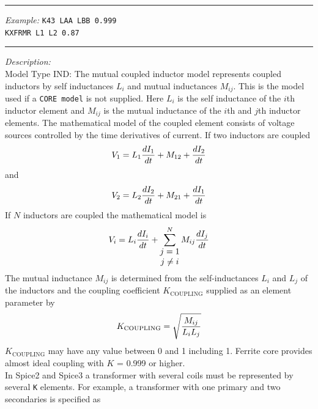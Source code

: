\documentclass{article}
\begin{document}
\newline
\rule{\textwidth}{0.5mm}
\newline
\textit{Example:}
\newline
\texttt{K43 LAA LBB 0.999 \\ KXFRMR L1 L2 0.87}
\newline
\rule{\textwidth}{0.5mm}
\newline
\textit{Description:}\\
Model Type {IND}: The mutual coupled inductor
model represents coupled inductors by self inductances $L_i$ and
mutual inductances $M_{ij}$. This is the model used if a
{\tt CORE model} is not supplied. Here $L_i$ is the self
inductance of the $i$th inductor element and $M_{ij}$ is the
mutual inductance of the $i$th and $j$th inductor elements. The
mathematical model of the coupled element consists of voltage
sources controlled by the time derivatives of current. If two
inductors are coupled
\begin{equation}
      V_1 = L_1 {{\textstyle dI_1} \over {\textstyle dt}}
         + M_{12} + {{\textstyle dI_2} \over {\textstyle dt}}
\end{equation}
and
\begin{equation}
      V_2 = L_2 {{\textstyle dI_2} \over {\textstyle dt}}
         + M_{21} + {{\textstyle dI_1} \over {\textstyle dt}}
\end{equation}
If $N$ inductors are coupled the mathematical model is
\begin{equation}
      V_i = L_i {{\textstyle dI_i} \over {\textstyle dt}}
         + \sum_{\shortstack{$j=1$\\ $j\ne i$}}^N
         M_{ij} {{\textstyle dI_j} \over {\textstyle dt}}
\end{equation}
The mutual inductance $M_{ij}$ is determined from the
self-inductances $L_i$ and $L_j$ of the inductors and the coupling
coefficient $K_{\mathrm{COUPLING}}$ supplied as an element parameter
by
\begin{equation}
      K_{\mathrm{COUPLING}} = \sqrt{{{\textstyle M_{ij}} \over{\textstyle L_iL_j}}}
\end{equation}
$K_{\mathrm{COUPLING}}$ may have any value between 0 and 1 including
1. Ferrite core provides almost ideal coupling with $K$ = 0.999 or
higher.\\
In Spice2 and Spice3 a transformer with several coils
must be represented by several {\tt K} elements. For example, a
transformer with one primary and two secondaries is specified as\\
\end{document}

